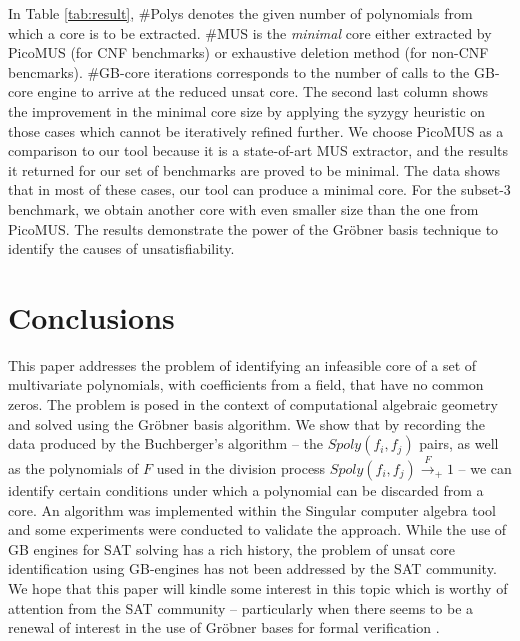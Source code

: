 In Table \ref{tab:result}, 
\#Polys denotes the given number of polynomials
from which a core is to be extracted. \#MUS is the {\it minimal} core either
extracted by PicoMUS (for CNF benchmarks) or exhaustive deletion method (for non-CNF bencmarks).
 \#GB-core iterations corresponds to the
number of calls to the GB-core engine to arrive at the reduced unsat
core. The second last column shows the improvement in the minimal core
size by applying the syzygy heuristic on those cases which cannot be
iteratively refined further. 
We choose PicoMUS as a comparison to our tool because it is a state-of-art MUS extractor,
and the results it returned for our set of benchmarks are proved to be minimal. 
The data shows that in most of these
cases, our tool can produce a minimal core. For the subset-3
benchmark, we obtain another core with even smaller size than the one from PicoMUS. The results
demonstrate the power of the Gr\"obner basis technique to identify the
causes of unsatisfiability. 



\section{Conclusions}\label{sec:conc}
This paper addresses the problem of identifying an infeasible core of
a set of multivariate polynomials, with coefficients from a field,
that have no common zeros. The problem is posed in the context of
computational algebraic geometry and solved using the Gr\"obner basis
algorithm. We show that by recording the data produced by the
Buchberger's algorithm -- the $Spoly(f_i,f_j)$ pairs, as well as the
polynomials of $F$ used in the division process
$Spoly(f_i,f_j)\xrightarrow{F}_+ 1$ -- we can identify certain
conditions under which a polynomial can be discarded from a core. An
algorithm was implemented within the Singular computer algebra tool
and some experiments were conducted to validate the approach. While
the use of GB engines for SAT solving has a rich history, the problem
of unsat core identification using GB-engines has not been addressed
by the SAT community. We hope that this paper will kindle some
interest in this topic which is worthy of attention from the SAT
community -- particularly when there seems to be a renewal of interest
in the use of Gr\"obner bases for formal verification
\cite{lv:tcad2013,gao:qe-gf-gb,kalla:fmcad_tut2015,rolf:date16}.    
